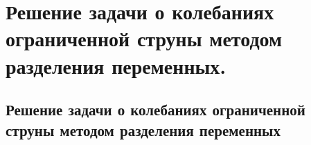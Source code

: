 \chapter{Решение задачи о колебаниях ограниченной струны методом разделения
переменных.}

\section{Решение задачи о колебаниях ограниченной струны методом разделения
переменных}
\newpage
